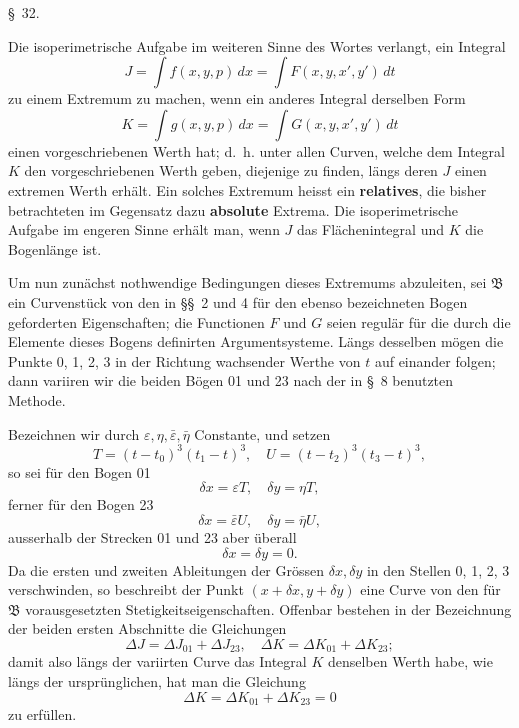 \documentclass[11pt,a4paper,leqno]{article}
\begin{document}
\begin{center}{\large \S~32.}\end{center}

Die isoperimetrische Aufgabe im weiteren Sinne des Wortes verlangt, ein Integral
\[
J=\int f(x,y,p)\,dx=\int F(x,y,x',y')\,dt
\]
zu einem Extremum zu machen, wenn ein anderes Integral derselben Form
\[
K=\int g(x,y,p)\,dx=\int G(x,y,x',y')\,dt
\]
einen vorgeschriebenen Werth hat; d.~h. unter allen Curven, welche dem Integral $K$ den vorgeschriebenen Werth geben, diejenige zu finden, längs deren $J$ einen extremen Werth erhält. Ein solches Extremum heisst ein \textbf{relatives}, die bisher betrachteten im Gegensatz dazu \textbf{absolute} Extrema. Die isoperimetrische Aufgabe im engeren Sinne erhält man, wenn $J$ das Flächenintegral und $K$ die Bogenlänge ist.

Um nun zunächst nothwendige Bedingungen dieses Extremums abzuleiten, sei $\mathfrak{B}$ ein Curvenstück von den in \S\S~2 und 4 für den ebenso bezeichneten Bogen geforderten Eigenschaften; die Functionen $F$ und $G$ seien regulär für die durch die Elemente dieses Bogens definirten Argumentsysteme. Längs desselben mögen die Punkte 0, 1, 2, 3 in der Richtung wachsender Werthe von $t$ auf einander folgen; dann variiren wir die beiden Bögen 01 und 23 nach der in \S~8 benutzten Methode.

Bezeichnen wir durch $\varepsilon,\eta,\bar\varepsilon,\bar\eta$ Constante, und setzen
\[
T=(t-t_0)^3(t_1-t)^3,
\quad
U=(t-t_2)^3(t_3-t)^3,
\]
so sei für den Bogen 01
\[
\delta x=\varepsilon T,
\quad
\delta y=\eta T,
\]
ferner für den Bogen 23
\[
\delta x=\bar\varepsilon U,
\quad
\delta y=\bar\eta U,
\]
ausserhalb der Strecken 01 und 23 aber überall
\[
\delta x=\delta y=0.
\]
Da die ersten und zweiten Ableitungen der Grössen $\delta x,\delta y$ in den Stellen 0, 1, 2, 3 verschwinden, so beschreibt der Punkt $(x+\delta x,y+\delta y)$ eine Curve von den für $\mathfrak{B}$ vorausgesetzten Stetigkeitseigenschaften. Offenbar bestehen in der Bezeichnung der beiden ersten Abschnitte die Gleichungen
\begin{equation}\tag{1}
\Delta J=\Delta J_{01}+\Delta J_{23},
\quad
\Delta K=\Delta K_{01}+\Delta K_{23};
\end{equation}
damit also längs der variirten Curve das Integral $K$ denselben Werth habe, wie längs der ursprünglichen, hat man die Gleichung
\[
\Delta K=\Delta K_{01}+\Delta K_{23}=0
\]
zu erfüllen.
\end{document}

